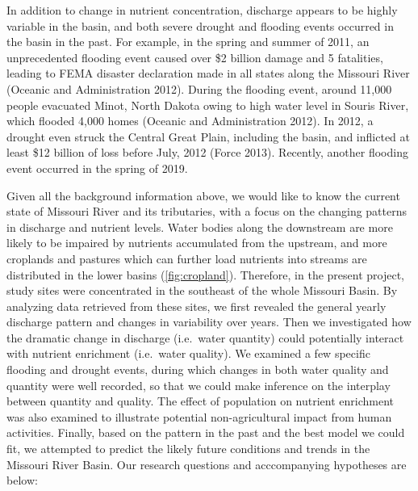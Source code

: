 \documentclass[12pt,]{article}
\begin{document}
In addition to change in nutrient concentration, discharge appears to be
highly variable in the basin, and both severe drought and flooding
events occurred in the basin in the past. For example, in the spring and
summer of 2011, an unprecedented flooding event caused over \$2 billion
damage and 5 fatalities, leading to FEMA disaster declaration made in
all states along the Missouri River (Oceanic and Administration 2012).
During the flooding event, around 11,000 people evacuated Minot, North
Dakota owing to high water level in Souris River, which flooded 4,000
homes (Oceanic and Administration 2012). In 2012, a drought even struck
the Central Great Plain, including the basin, and inflicted at least
\$12 billion of loss before July, 2012 (Force 2013). Recently, another
flooding event occurred in the spring of 2019.

Given all the background information above, we would like to know the
current state of Missouri River and its tributaries, with a focus on the
changing patterns in discharge and nutrient levels. Water bodies along
the downstream are more likely to be impaired by nutrients accumulated
from the upstream, and more croplands and pastures which can further
load nutrients into streams are distributed in the lower basins
(\autoref{fig:cropland}). Therefore, in the present project, study sites
were concentrated in the southeast of the whole Missouri Basin. By
analyzing data retrieved from these sites, we first revealed the general
yearly discharge pattern and changes in variability over years. Then we
investigated how the dramatic change in discharge (i.e.~water quantity)
could potentially interact with nutrient enrichment (i.e.~water
quality). We examined a few specific flooding and drought events, during
which changes in both water quality and quantity were well recorded, so
that we could make inference on the interplay between quantity and
quality. The effect of population on nutrient enrichment was also
examined to illustrate potential non-agricultural impact from human
activities. Finally, based on the pattern in the past and the best model
we could fit, we attempted to predict the likely future conditions and
trends in the Missouri River Basin. Our research questions and
acccompanying hypotheses are below:
\end{document}

